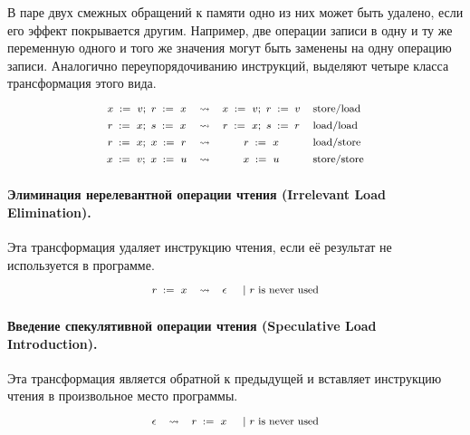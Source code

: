 В паре двух смежных обращений к памяти
одно из них может быть удалено, 
если его эффект покрывается другим. 
Например, две операции записи в одну и ту же переменную 
одного и того же значения могут быть заменены 
на одну операцию записи. 
Аналогично переупорядочиванию инструкций, 
выделяют четыре класса трансформация этого вида. 
%
\[\def\arraystretch{1.4}\footnotesize
  \begin{array}{cccl} 

      \writeInst{}{x}{v} \seq \readInst{}{r}{x} 
    & \leadsto 
    & \writeInst{}{x}{v} \seq \assignInst{r}{v}
    & \text{store/load}  \\ 

      \readInst{}{r}{x} \seq \readInst{}{s}{x} 
    & \leadsto 
    & \readInst{}{r}{x} \seq \assignInst{s}{r}
    & \text{load/load}  \\ 

      \readInst{}{r}{x} \seq \writeInst{}{x}{r} 
    & \leadsto 
    & \readInst{}{r}{x} 
    & \text{load/store}  \\ 

      \writeInst{}{x}{v} \seq \writeInst{}{x}{u} 
    & \leadsto 
    & \writeInst{}{x}{u}
    & \text{store/store}  \\ 

  \end{array}
\]

\paragraph{
Элиминация нерелевантной операции чтения
(Irrelevant Load Elimination).
}

Эта трансформация удаляет инструкцию чтения, 
если её результат не используется в программе. 
%
\[\def\arraystretch{1.4}\footnotesize
  \begin{array}{cccl} 

      \readInst{}{r}{x} 
    & \leadsto 
    & \epsInst
    & ~|~ \text{$r$ is never used}  \\ 

  \end{array}
\]

\paragraph{
Введение спекулятивной операции чтения
(Speculative Load Introduction).
}

Эта трансформация является обратной к предыдущей и вставляет инструкцию чтения в произвольное место программы.
%
\[\def\arraystretch{1.4}\footnotesize
  \begin{array}{cccl} 

      \epsInst
    & \leadsto 
    & \readInst{}{r}{x} 
    & ~|~ \text{$r$ is never used}  \\ 

  \end{array}
\]

